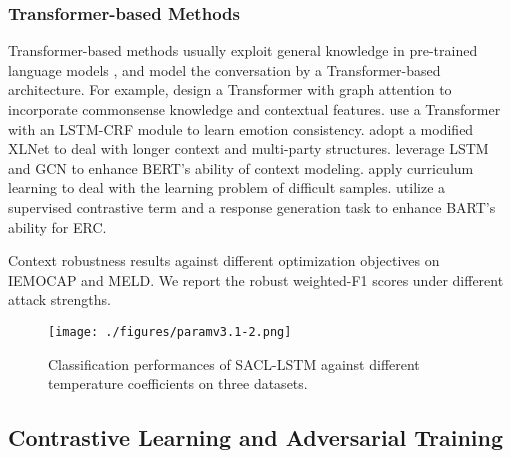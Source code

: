 \documentclass[11pt]{article}
\begin{document}
\subsubsection{Transformer-based Methods}
Transformer-based methods 
\citep{DBLP:conf/emnlp/ZhongWM19,DBLP:conf/sigdial/WangZMWX20,DBLP:conf/aaai/ShenCQX21,DBLP:conf/acl/ZhuP0ZH20,DBLP:conf/emnlp/Li00W21,DBLP:conf/emnlp/LeeC21,DBLP:conf/naacl/LeeL22,DBLP:conf/aaai/LiYQ22,DBLP:conf/emnlp/SongXH22}  usually exploit general knowledge in pre-trained language models \citep{DBLP:conf/naacl/DevlinCLT19,DBLP:journals/corr/abs-1907-11692,DBLP:conf/emnlp/0001HDZJMS22}, and model the conversation by a Transformer-based architecture.
For example,
\citet{DBLP:conf/emnlp/ZhongWM19} 
design a Transformer with graph attention to incorporate commonsense knowledge and contextual features.
\citet{DBLP:conf/sigdial/WangZMWX20} use a Transformer with an LSTM-CRF module to learn emotion consistency.
\citet{DBLP:conf/aaai/ShenCQX21} adopt a modified XLNet to deal with longer context and multi-party structures.
\citet{DBLP:conf/emnlp/LeeC21} leverage LSTM and GCN to enhance BERT's ability of context modeling.
\citet{DBLP:conf/aaai/YangSMC22} apply curriculum learning to deal with the learning problem of difficult samples.
\citet{DBLP:conf/aaai/LiYQ22}
utilize a supervised contrastive term and a response generation task to enhance BART's ability for ERC. 

\begin{table*}[t]
\centering  
{}
  \caption{
  Context robustness results against different optimization objectives on IEMOCAP and MELD. We report the robust weighted-F1 scores under different attack strengths.
  }
  \label{tab:appen:robusts1}
\end{table*}
\begin{figure*}[t]
  \centering
    \texttt{[image: ./figures/paramv3.1-2.png]}
    \caption{Classification performances of SACL-LSTM against different temperature coefficients on three datasets.}
  \label{fig:variant}
\end{figure*}


\subsection{Contrastive Learning and Adversarial Training}
\end{document}

